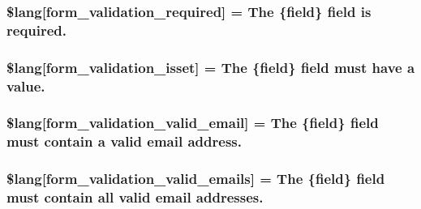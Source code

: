 \subsubsection[{\$lang}]{\setlength{\rightskip}{0pt plus 5cm}\$lang\mbox{[}\textquotesingle{}form\+\_\+validation\+\_\+required\textquotesingle{}\mbox{]} = \textquotesingle{}The \{field\} field is required.\textquotesingle{}}\label{form__validation__lang_8php_a2335c24e2213207c5dda58ec093673a9}
\hypertarget{form__validation__lang_8php_a941575e651258a5a17341aca4e587898}{}
\subsubsection[{\$lang}]{\setlength{\rightskip}{0pt plus 5cm}\$lang\mbox{[}\textquotesingle{}form\+\_\+validation\+\_\+isset\textquotesingle{}\mbox{]} = \textquotesingle{}The \{field\} field must have {\bf a} value.\textquotesingle{}}\label{form__validation__lang_8php_a941575e651258a5a17341aca4e587898}
\hypertarget{form__validation__lang_8php_a652d5be4d397dcac4407294c2436af34}{}
\subsubsection[{\$lang}]{\setlength{\rightskip}{0pt plus 5cm}\$lang\mbox{[}\textquotesingle{}form\+\_\+validation\+\_\+valid\+\_\+email\textquotesingle{}\mbox{]} = \textquotesingle{}The \{field\} field must contain {\bf a} valid email address.\textquotesingle{}}\label{form__validation__lang_8php_a652d5be4d397dcac4407294c2436af34}
\hypertarget{form__validation__lang_8php_af9ec234a36f18a91c981985c3db4333e}{}
\subsubsection[{\$lang}]{\setlength{\rightskip}{0pt plus 5cm}\$lang\mbox{[}\textquotesingle{}form\+\_\+validation\+\_\+valid\+\_\+emails\textquotesingle{}\mbox{]} = \textquotesingle{}The \{field\} field must contain all valid email addresses.\textquotesingle{}}\label{form__validation__lang_8php_af9ec234a36f18a91c981985c3db4333e}
\hypertarget{form__validation__lang_8php_af9467e9ed3767f5bff205b79d706fe0a}{}
